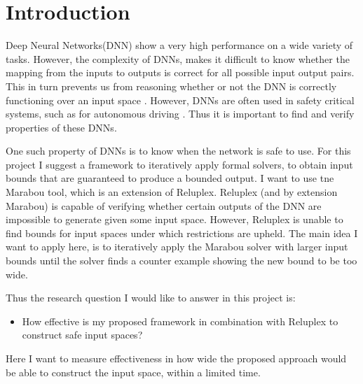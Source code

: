 \documentclass[../main.tex]{subfiles}
\begin{document}
\section{Introduction}
Deep Neural Networks(DNN) show a very high performance on a wide variety of tasks. However, the complexity of DNNs, makes it difficult to know whether the mapping from the inputs to outputs is correct for all possible input output pairs. This in turn prevents us from reasoning whether or not the DNN is correctly functioning over an input space \cite{szegedyIntriguingPropertiesNeural2014}. However, DNNs are often used in safety critical systems, such as for autonomous driving \cite{bojarskiEndEndLearning2016}. Thus it is important to find and verify properties of these DNNs.
\par One such property of DNNs is to know when the network is safe to use. For this project I suggest a framework to iteratively apply formal solvers, to obtain input bounds that are guaranteed to produce a bounded output.
I want to use tne Marabou\cite{katzMarabouFrameworkVerification2019} tool, which is an extension of Reluplex\cite{katzReluplexEfficientSMT2017}. Reluplex (and by extension Marabou) is capable of verifying whether certain outputs of the DNN are impossible to generate given some input space. However, Reluplex is unable to find bounds for input spaces under which restrictions are upheld. The main idea I want to apply here, is to iteratively apply the Marabou solver with larger input bounds until the solver finds a counter example showing the new bound to be too wide.
\par Thus the research question I would like to answer in this project is:
\begin{itemize}
    \item How effective is my proposed framework in combination with Reluplex to construct safe input spaces?
\end{itemize}
Here I want to measure effectiveness in how wide the proposed approach would be able to construct the input space, within a limited time.
\end{document}
